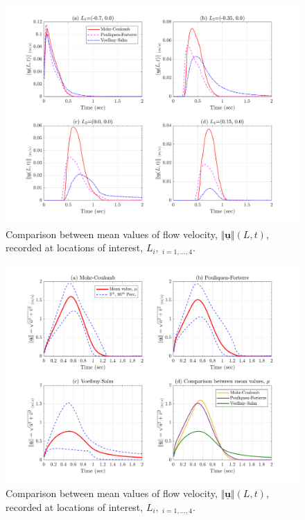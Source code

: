 \documentclass{article}
\begin{document}
\begin{figure}[H]
        \centering
        \includegraphics[width=1\textwidth]{InclinedPlane/Velocity/Vel_mean.png}
        \caption{Comparison between mean values of flow velocity, $\Vert \underline{\mathbf{u}} \Vert(L,t)$, recorded at locations of interest, $L_i, \ _{i=1,...,4}$.}
        \label{fig:Ramp-LM-Vel-means}
\end{figure}

\begin{figure}[H]
        \centering
        \includegraphics[width=1\textwidth]{InclinedPlane/Velocity/Vel_SpatialRec.png}
        \caption{Comparison between mean values of flow velocity, $\Vert \underline{\mathbf{u}} \Vert(L,t)$, recorded at locations of interest, $L_i, \ _{i=1,...,4}$.}
        \label{fig:Ramp-Vel-spatial}
\end{figure}
\end{document}

